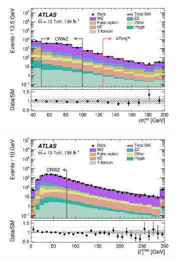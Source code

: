\begin{figure}
    \centering
    \begin{subfigure}[b]{0.49\textwidth}
      \centering
      \includegraphics[width=0.98\textwidth]{figs/rpvthreel/CRWZ_Nm1_mTmin_logy.png}
      \caption{}
      \label{fig:Nminus1CRWZmTmin}
    \end{subfigure}
    \hfill
    \begin{subfigure}[b]{0.49\textwidth}
      \centering
      \includegraphics[width=0.98\textwidth]{figs/rpvthreel/CRWZ_Nm1_met_logy.png}
      \caption{}
      \label{fig:Nminus1CRWZmet}
    \end{subfigure}
    \hfill
    \begin{subfigure}[b]{0.49\textwidth}
      \centering

\end{subfigure}
\end{figure}
